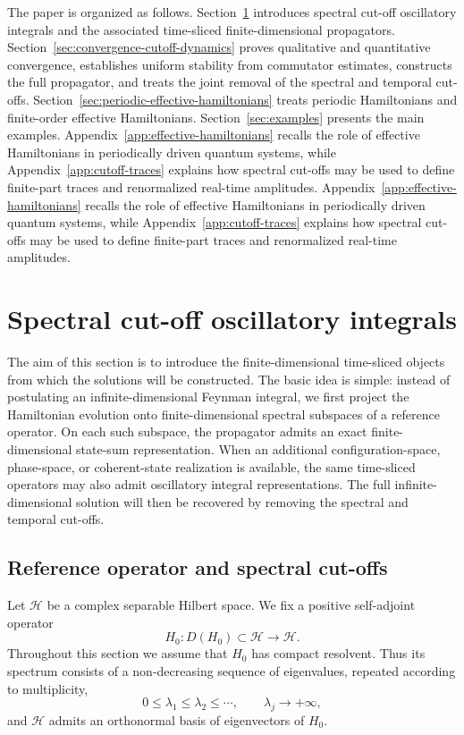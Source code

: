 \documentclass[11pt]{amsart}
\theoremstyle{plain}
\theoremstyle{definition}
\theoremstyle{remark}
\newcommand{\Hilb}{\mathcal H}
\begin{document}
The paper is organized as follows.  Section~\ref{sec:cutoff-oscillatory-integrals}
introduces spectral cut-off oscillatory integrals and the associated
time-sliced finite-dimensional propagators.  Section~\ref{sec:convergence-cutoff-dynamics}
proves qualitative and quantitative convergence, establishes uniform
stability from commutator estimates, constructs the full propagator, and
treats the joint removal of the spectral and temporal cut-offs.
Section~\ref{sec:periodic-effective-hamiltonians} treats periodic
Hamiltonians and finite-order effective Hamiltonians.  Section~\ref{sec:examples}
presents the main examples.  Appendix~\ref{app:effective-hamiltonians}
recalls the role of effective Hamiltonians in periodically driven
quantum systems, while Appendix~\ref{app:cutoff-traces} explains how
spectral cut-offs may be used to define finite-part traces and
renormalized real-time amplitudes. Appendix~\ref{app:effective-hamiltonians}
recalls the role of effective Hamiltonians in periodically driven
quantum systems, while Appendix~\ref{app:cutoff-traces} explains how
spectral cut-offs may be used to define finite-part traces and
renormalized real-time amplitudes.

\section{Spectral cut-off oscillatory integrals}
\label{sec:cutoff-oscillatory-integrals}

The aim of this section is to introduce the finite-dimensional
time-sliced objects from which the solutions will be constructed.  The
basic idea is simple: instead of postulating an infinite-dimensional
Feynman integral, we first project the Hamiltonian evolution onto
finite-dimensional spectral subspaces of a reference operator.  On
each such subspace, the propagator admits an exact finite-dimensional
state-sum representation.  When an additional configuration-space,
phase-space, or coherent-state realization is available, the same
time-sliced operators may also admit oscillatory integral
representations.  The full infinite-dimensional solution will then be
recovered by removing the spectral and temporal cut-offs.

\subsection{Reference operator and spectral cut-offs}

Let \(\Hilb\) be a complex separable Hilbert space.  We fix a positive
self-adjoint operator
\[
        H_0:D(H_0)\subset \Hilb\longrightarrow \Hilb.
\]
Throughout this section we assume that \(H_0\) has compact resolvent.
Thus its spectrum consists of a non-decreasing sequence of eigenvalues,
repeated according to multiplicity,
\[
        0\leq \lambda_1\leq \lambda_2\leq \cdots,
        \qquad
        \lambda_j\to+\infty,
\]
and \(\Hilb\) admits an orthonormal basis of eigenvectors of \(H_0\).
\end{document}
